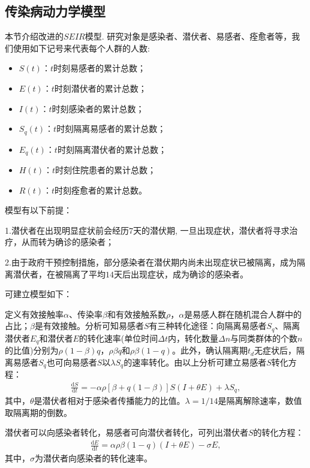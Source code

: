 \documentclass{whutmod}
\begin{document}
		\subsection{传染病动力学模型}
			本节介绍改进的$SEIR$模型. 研究对象是感染者、潜伏者、易感者、痊愈者等，我们使用如下记号来代表每个人群的人数:
			\begin{itemize}
				\item $S(t)$：$t$时刻易感者的累计总数；
				\item $E(t)$：$t$时刻潜伏者的累计总数；
				\item $I(t)$：$t$时刻感染者的累计总数；
				\item $S_q(t)$：$t$时刻隔离易感者的累计总数；
				\item $E_q(t)$：$t$时刻隔离潜伏者的累计总数；
				\item $H(t)$：$t$时刻住院患者的累计总数；
				\item $R(t)$：$t$时刻痊愈者的累计总数。
			\end{itemize}
		
			模型有以下前提：

			1.潜伏者在出现明显症状前会经历$7$天的潜伏期, 一旦出现症状，潜伏者将寻求治疗，从而转为确诊的感染者；
			
			2.由于政府干预控制措施，部分感染者在潜伏期内尚未出现症状已被隔离，成为隔离潜伏者，在被隔离了平均$14$天后出现症状，成为确诊的感染者。
			
			可建立模型如下：
			
			定义有效接触率$\alpha$、传染率$\beta$和有效接触系数$\rho$，$\alpha$是易感人群在随机混合人群中的占比；$\beta$是有效接触。分析可知易感者$S$有三种转化途径：向隔离易感者$S_q$、隔离潜伏者$E_q$和潜伏者$E$的转化速率(单位时间$\Delta t$内，转化数量$\Delta n$与同类群体的个数$n$的比值)分别为$\rho (1-\beta)q$，$ \rho \beta q$和$\rho \beta(1-q)$。此外，确认隔离期$t_d$无症状后，隔离易感者$S_q$也可向易感者$S$以$\lambda S_{q}$的速率转化。由以上分析可建立易感者$S$转化方程：
			\begin{gather}
			\frac{\mathrm{d} S}{\mathrm{d} t}=-\alpha\rho [\beta +q(1-\beta)]S(I+\theta E)+\lambda S_{q},
			\end{gather}
			其中，$\theta $是潜伏者相对于感染者传播能力的比值。$\lambda=1/14$是隔离解除速率，数值取隔离期的倒数。
		
			潜伏者可以向感染者转化，易感者可向潜伏者转化，可列出潜伏者$S$的转化方程：
			\begin{gather}
			\frac{\mathrm{d} E}{\mathrm{d} t}=\alpha\rho\beta(1-q) (I+\theta E)-\sigma E,
			\end{gather}
			其中，$\sigma$为潜伏者向感染者的转化速率。
			
\end{document}
